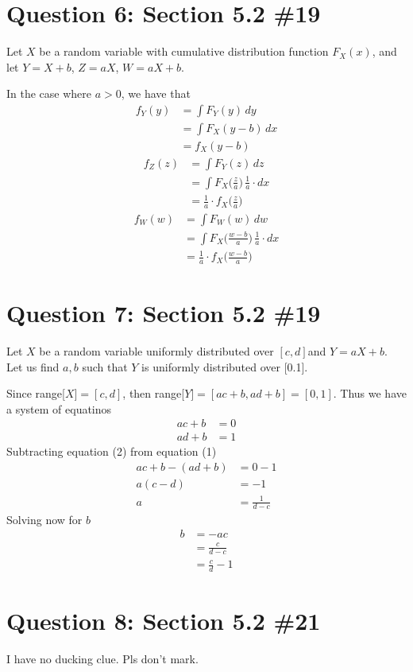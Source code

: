 \documentclass[11pt, oneside]{article}   	%
\begin{document}
\section*{Question 6: Section 5.2 \#19}

Let $X$ be a random variable with cumulative distribution function $F_X(x)$, and let $Y=X+b$, $Z=aX$, $W=aX+b$.

In the case where $a >0$, we have that
\begin{align*}
	f_Y(y) & =  \int F_Y(y) \, dy \\
	& = \int F_X(y-b) \, dx\\
	& = f_X(y-b)
\end{align*}
\begin{align*}
	f_Z(z) & = \int F_Y(z) \, dz \\
	& = \int F_X\Big(\frac{z}{a}\Big) \, \frac{1}{a}\cdot dx\\
	& = \frac{1}{a}\cdot f_X\Big(\frac{z}{a}\Big)
\end{align*}
\begin{align*}
	f_W(w) & = \int F_W(w) \, dw \\
	& = \int F_X\Big(\frac{w-b}{a}\Big) \, \frac{1}{a}\cdot dx\\
	& = \frac{1}{a}\cdot f_X\Big(\frac{w-b}{a}\Big)
\end{align*}


\section*{Question 7: Section 5.2 \#19}

Let $X$ be a random variable uniformly distributed over $[c,d]$and $Y=aX+b$. Let us find $a,b$ such that $Y$ is uniformly distributed over [0.1].

Since range[$X] = [c, d]$, then range[$Y] = [ac+b, ad+b] =[0,1]$.
Thus we have a system of equatinos
\begin{align}
	ac+b & = 0 \\
	ad+b & = 1
\end{align}
Subtracting equation (2) from equation (1)
\begin{align*}
	ac+b - (ad+b) & = 0 -1 \\
	a(c-d) & = -1 \\
	a & = \frac{1}{d-c}
\end{align*}
Solving now for $b$
\begin{align*}
	b & = -ac \\
	& = \frac{c}{d-c} \\
	& = \frac{c}{d} - 1
\end{align*}


\section*{Question 8: Section 5.2 \#21}

I have no ducking clue. Pls don't mark.
\end{document}
